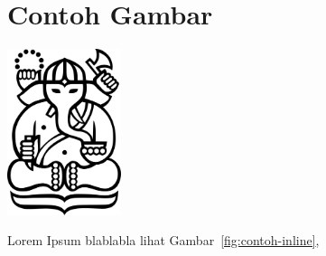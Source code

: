 \section{Contoh Gambar}

\begin{center}
    \includegraphics[width=0.25\textwidth]{images/example.jpg}
    \label{fig:contoh-inline}
\end{center}

Lorem Ipsum blablabla lihat Gambar~\ref{fig:contoh-inline}, 
